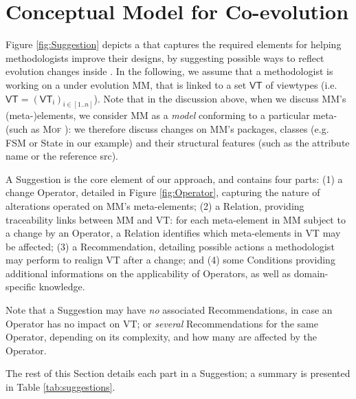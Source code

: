 \section{Conceptual Model for \Viewtype Co-evolution}
\label{sec:Suggestion}

Figure \ref{fig:Suggestion} depicts a \metamodel that captures the
required elements for helping methodologists improve their \viewtype designs,
by suggesting possible ways to reflect evolution changes inside \viewtypes.
In the following, we assume that a methodologist is working on a \metamodel
under evolution \textsf{MM}, that is linked to a set $\mathsf{VT}$ of viewtypes
(i.e. $\mathsf{VT} = (\mathsf{VT}_\mathsf{i})_{\mathsf{i}\in [1..n]}$). Note that in the discussion above, when we discuss
\textsf{MM}'s (meta-)elements, we consider \textsf{MM} as a \emph{model}
conforming to a particular meta-\metamodel (such as \textsc{Mof} \cite{TR:OMG-MOF:2016}):
we therefore discuss changes on \textsf{MM}'s packages, classes (e.g. 
\textsf{FSM} or \textsf{State} in our example) and their structural features
(such as the attribute \textsf{name} or the reference \textsf{src}).

A \textsf{Suggestion} is the core element of our approach, and contains four 
parts: (1) a change \textsf{Operator}, detailed in Figure \ref{fig:Operator}, capturing the nature of
alterations operated on \textsf{MM}'s meta-elements; 
    (2) a \textsf{Relation}, providing traceability links between \textsf{MM} 
		and \textsf{VT}: for each meta-element in \textsf{MM} subject to a 
		change by an \textsf{Operator}, a \textsf{Relation} identifies which 
		meta-elements in \textsf{VT} may be affected;
    (3) a \textsf{Recommendation}, detailing possible actions a methodologist 
		may perform to realign \textsf{VT} after a change;
		 and (4) some \textsf{Condition}s providing additional informations on the
		applicability of \textsf{Operator}s, as well as domain-specific knowledge.

Note that a \textsf{Suggestion} may 
have \emph{no} associated \textsf{Recommendation}s, in case an \textsf{Operator} has no
impact on \textsf{VT}; or \emph{several} \textsf{Recommendation}s for the same 
\textsf{Operator}, depending on its complexity, and how many \viewtypes are 
affected by the \textsf{Operator}.

The rest of this Section details each part in a \textsf{Suggestion}; a summary
is presented in Table \ref{tab:suggestions}.







